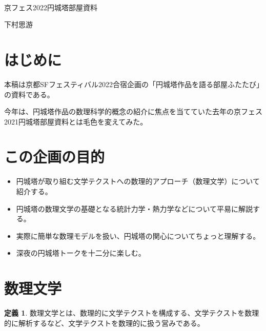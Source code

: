 \documentclass[10pt, a5paper, twoside]{jsarticle}
\theoremstyle{definition}
\newtheorem{dfn}{定義}
\begin{document}
	{\Large 　} %

	\begin{center}

		\Large{京フェス2022円城塔部屋資料}

		\vspace{3mm}
		
		\large{下村思游}

	\end{center}

	\vspace{3mm}

	\section{はじめに}

		本稿は京都SFフェスティバル2022合宿企画の「円城塔作品を語る部屋ふたたび」の資料である。

		今年は、円城塔作品の数理科学的概念の紹介に焦点を当てていた去年の京フェス2021円城塔部屋資料とは毛色を変えてみた。

	\section{この企画の目的}

		\begin{itemize}

			\item 円城塔が取り組む文学テクストへの数理的アプローチ（数理文学）について紹介する。

			\item 円城塔の数理文学の基礎となる統計力学・熱力学などについて平易に解説する。

			\item 実際に簡単な数理モデルを扱い、円城塔の関心についてちょっと理解する。

			\item 深夜の円城塔トークを十二分に楽しむ。

		\end{itemize}

	\section{数理文学}

		\begin{dfn}

			数理文学とは、数理的に文学テクストを構成する、文学テクストを数理的に解析するなど、文学テクストを数理的に扱う営みである。

		\end{dfn}
\end{document}
